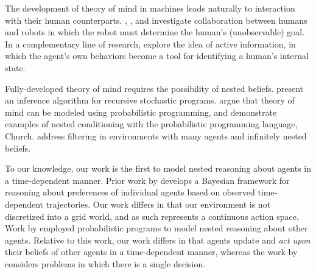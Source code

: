 \documentclass[twoside]{article}
\begin{document}
The development of theory of mind in machines leads naturally to interaction with their human counterparts. \textcite{awais2010human}, \textcite{fern2007decision}, and \textcite{nguyen2012capir} investigate collaboration between humans and robots in which the robot must determine the human's (unobservable) goal. In a complementary line of research, \textcite{sadigh2016information} explore the idea of active information, in which the agent's own behaviors become a tool for identifying a human's internal state.

Fully-developed theory of mind requires the possibility of nested beliefs. \textcite{koller1997effective} present an inference algorithm for recursive stochastic programs. \textcite{frith2005theory} argue that theory of mind can be modeled using probabilistic programming, and demonstrate examples of nested conditioning with the probabilistic programming language, Church. \textcite{zettlemoyer2009multi} address filtering in environments with many agents and infinitely nested beliefs. 

To our knowledge, our work is the first to model nested reasoning about agents in a time-dependent manner. Prior work by \textcite{baker2009action} develops a Bayesian framework for reasoning about preferences of individual agents based on observed time-dependent trajectories. Our work differs in that our environment is not discretized into a grid world, and as such represents a continuous action space. Work by \textcite{stuhlmuller2014reasoning} employed probabilistic programs to model nested reasoning about other agents. 
Relative to this work, our work differs in that agents update and \textit{act upon} their beliefs of other agents in a time-dependent manner, whereas the work by \textcite{stuhlmuller2014reasoning} considers problems in which there is a single decision.

\end{document}
